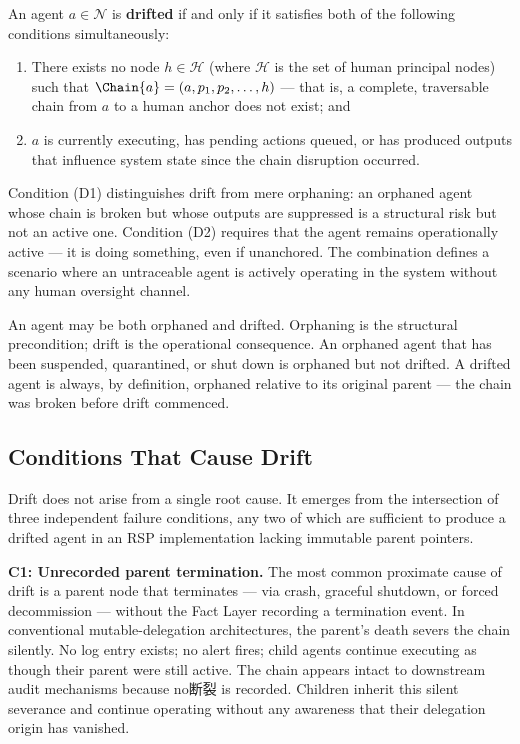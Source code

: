 \begin{definition}
\label{def:drifted-agent}
An agent $a \in \mathcal{N}$ is \textbf{drifted} if and only if it satisfies both of the following conditions simultaneously:

\begin{enumerate}
    \item[(D1)] There exists no node $h \in \mathcal{H}$ (where $\mathcal{H}$ is the set of human principal nodes) such that $\Chain{a} = (a, p_1, p_2, \dots, h)$ — that is, a complete, traversable chain from $a$ to a human anchor does not exist; and
    \item[(D2)] $a$ is currently executing, has pending actions queued, or has produced outputs that influence system state since the chain disruption occurred.
\end{enumerate}

Condition (D1) distinguishes drift from mere orphaning: an orphaned agent whose chain is broken but whose outputs are suppressed is a structural risk but not an active one. Condition (D2) requires that the agent remains operationally active — it is doing something, even if unanchored. The combination defines a scenario where an untraceable agent is actively operating in the system without any human oversight channel.

\end{definition}

\begin{note}
An agent may be both orphaned and drifted. Orphaning is the structural precondition; drift is the operational consequence. An orphaned agent that has been suspended, quarantined, or shut down is orphaned but not drifted. A drifted agent is always, by definition, orphaned relative to its original parent — the chain was broken before drift commenced.
\end{note}

\subsection{Conditions That Cause Drift}
\label{sec:drift-causes}

Drift does not arise from a single root cause. It emerges from the intersection of three independent failure conditions, any two of which are sufficient to produce a drifted agent in an RSP implementation lacking immutable parent pointers.

\bigskip
\noindent\textbf{C1: Unrecorded parent termination.} The most common proximate cause of drift is a parent node that terminates — via crash, graceful shutdown, or forced decommission — without the Fact Layer recording a termination event. In conventional mutable-delegation architectures, the parent's death severs the chain silently. No log entry exists; no alert fires; child agents continue executing as though their parent were still active. The chain appears intact to downstream audit mechanisms because no断裂 is recorded. Children inherit this silent severance and continue operating without any awareness that their delegation origin has vanished.

